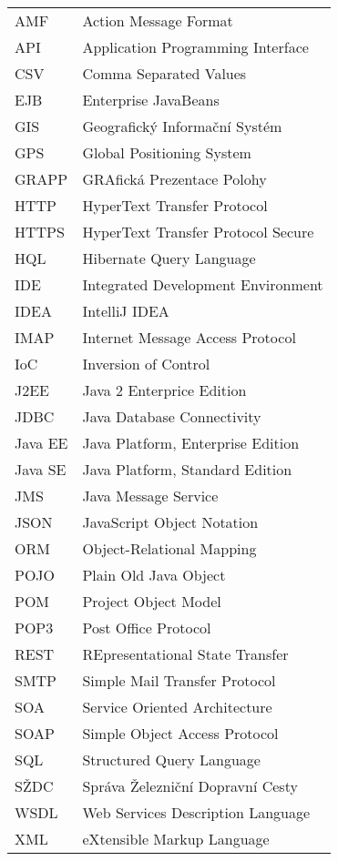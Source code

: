 
\seznamzkr

\begin{tabular}{ll}
  AMF		& Action Message Format					\\
  API		& Application Programming Interface		\\
  CSV		& Comma Separated Values				\\
  EJB		& Enterprise JavaBeans					\\
  GIS		& Geografický Informační Systém			\\
  GPS		& Global Positioning System				\\
  GRAPP		& GRAfická Prezentace Polohy			\\
  HTTP		& HyperText Transfer Protocol			\\
  HTTPS		& HyperText Transfer Protocol Secure	\\
  HQL		& Hibernate Query Language				\\
  IDE		& Integrated Development Environment	\\
  IDEA		& IntelliJ IDEA							\\
  IMAP		& Internet Message Access Protocol		\\
  IoC		& Inversion of Control					\\
  J2EE		& Java 2 Enterprice Edition				\\
  JDBC		& Java Database Connectivity			\\
  Java EE	& Java Platform, Enterprise Edition		\\
  Java SE	& Java Platform, Standard Edition		\\
  JMS		& Java Message Service					\\
  JSON		& JavaScript Object Notation			\\
  ORM		& Object-Relational Mapping				\\
  POJO		& Plain Old Java Object					\\
  POM		& Project Object Model					\\
  POP3		& Post Office Protocol					\\
  REST		& REpresentational State Transfer		\\
  SMTP		& Simple Mail Transfer Protocol			\\
  SOA		& Service Oriented Architecture			\\
  SOAP		& Simple Object Access Protocol 		\\
  SQL		& Structured Query Language		 		\\
  SŽDC		& Správa Železniční Dopravní Cesty 		\\
  WSDL		& Web Services Description Language		\\
  XML		& eXtensible Markup Language			\\
\end{tabular}

